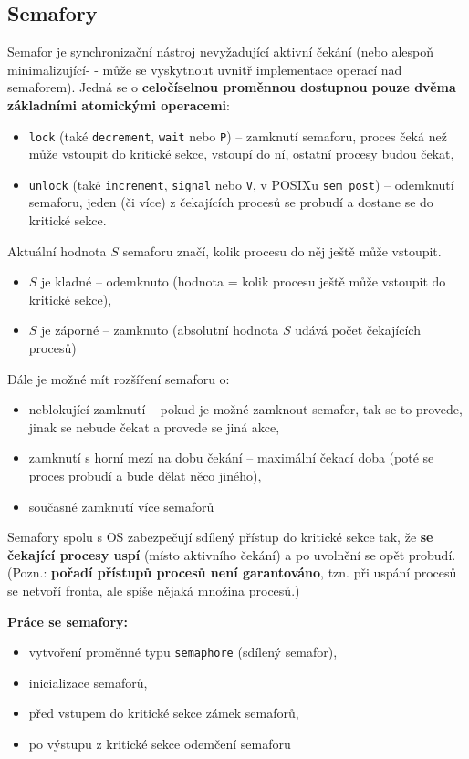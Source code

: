 \documentclass[a4paper, 11pt]{article}
\newcommand{\tcmd}[1]{\texttt{#1}}
\begin{document}
\subsection{Semafory}
Semafor je synchronizační nástroj nevyžadující aktivní čekání (nebo alespoň minimalizující- - může se vyskytnout uvnitř implementace operací nad semaforem). Jedná se o \textbf{celočíselnou proměnnou dostupnou pouze dvěma základními atomickými operacemi}: 
\begin{itemize}
    \item \tcmd{lock} (také \tcmd{decrement}, \tcmd{wait} nebo \tcmd{P}) -- zamknutí semaforu, proces čeká než může vstoupit do kritické sekce, vstoupí do ní, ostatní procesy budou čekat,
    \item \tcmd{unlock} (také \tcmd{increment}, \tcmd{signal} nebo \tcmd{V}, v POSIXu \tcmd{sem\_post}) -- odemknutí semaforu, jeden (či více) z čekajících procesů se probudí a dostane se do kritické sekce.
\end{itemize}

Aktuální hodnota $S$ semaforu značí, kolik procesu do něj ještě může vstoupit.
\begin{itemize}
    \item $S$ je kladné -- odemknuto (hodnota = kolik procesu ještě může vstoupit do kritické sekce),
    \item $S$ je záporné -- zamknuto (absolutní hodnota $S$ udává počet čekajících procesů) 
\end{itemize}

\newpage
Dále je možné mít rozšíření semaforu o:
\begin{itemize}
    \item neblokující zamknutí -- pokud je možné zamknout semafor, tak se to provede, jinak se nebude čekat a provede se jiná akce,
    \item zamknutí s horní mezí na dobu čekání -- maximální čekací doba (poté se proces probudí a bude dělat něco jiného),
    \item současné zamknutí více semaforů
\end{itemize}
 
Semafory spolu s OS zabezpečují sdílený přístup do kritické sekce tak, že \textbf{se čekající procesy uspí} (místo aktivního čekání) a po uvolnění se opět probudí. (Pozn.: \textbf{pořadí přístupů procesů není garantováno}, tzn. při uspání procesů se netvoří fronta, ale spíše nějaká množina procesů.)

\textbf{Práce se semafory:}
\begin{itemize}
    \item vytvoření proměnné typu \tcmd{semaphore} (sdílený semafor),
    \item inicializace semaforů,
    \item před vstupem do kritické sekce zámek semaforů,
    \item po výstupu z kritické sekce odemčení semaforu
\end{itemize}
 
\end{document}
